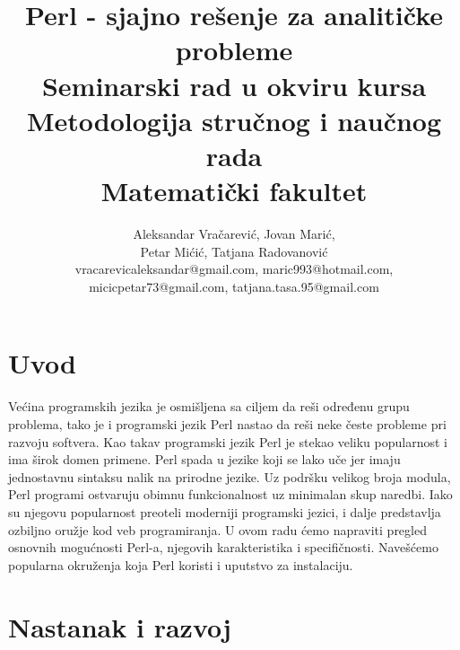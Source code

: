 \documentclass[a4paper]{article}
\begin{document}
\title{Perl - sjajno re\v senje za analiti\v cke probleme\\ \small{Seminarski rad u okviru kursa\\Metodologija stručnog i naučnog rada\\ Matematički fakultet}}

\author{Aleksandar Vračarević, Jovan Marić,\\ Petar Mićić, Tatjana Radovanović\\ vracarevicaleksandar@gmail.com, maric993@hotmail.com,\\ micicpetar73@gmail.com, tatjana.tasa.95@gmail.com}


\maketitle

\setcounter{tocdepth}{1}
\tableofcontents

\newpage

\section{Uvod}
\label{sec:uvod}

Ve\'cina programskih jezika je osmi\v sljena sa ciljem da reši određenu grupu problema, tako je i programski jezik Perl nastao da reši neke česte probleme pri razvoju softvera. Kao takav programski jezik Perl je stekao veliku popularnost i ima širok domen primene. Perl spada u jezike koji se lako uče jer imaju jednostavnu sintaksu nalik na prirodne jezike. Uz podršku velikog broja modula, Perl programi ostvaruju obimnu funkcionalnost uz minimalan skup naredbi. Iako su njegovu popularnost
preoteli moderniji programski jezici, i dalje predstavlja ozbiljno oružje kod veb programiranja.
U ovom radu \'cemo napraviti pregled osnovnih mogućnosti Perl-a, njegovih karakteristika i specifičnosti. Navešćemo popularna okruženja koja Perl koristi i uputstvo za instalaciju.




\section{Nastanak i razvoj}
\end{document}
